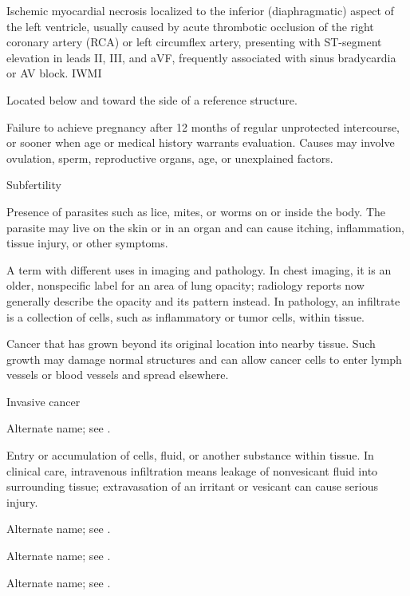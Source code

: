  Ischemic myocardial necrosis localized to the inferior (diaphragmatic) aspect of the left ventricle, usually caused by acute thrombotic occlusion of the right coronary artery (RCA) or left circumflex artery, presenting with ST-segment elevation in leads II, III, and aVF, frequently associated with sinus bradycardia or AV block.
\synonyms
IWMI

 Located below and toward the side of a reference structure.

 Failure to achieve pregnancy after 12 months of regular unprotected intercourse, or sooner when age or medical history warrants evaluation. Causes may involve ovulation, sperm, reproductive organs, age, or unexplained factors.

\synonyms
Subfertility

 Presence of parasites such as lice, mites, or worms on or inside the body. The parasite may live on the skin or in an organ and can cause itching, inflammation, tissue injury, or other symptoms.

 A term with different uses in imaging and pathology. In chest imaging, it is an older, nonspecific label for an area of lung opacity; radiology reports now generally describe the opacity and its pattern instead. In pathology, an infiltrate is a collection of cells, such as inflammatory or tumor cells, within tissue.

 Cancer that has grown beyond its original location into nearby tissue. Such growth may damage normal structures and can allow cancer cells to enter lymph vessels or blood vessels and spread elsewhere.

\synonyms
Invasive cancer

 Alternate name; see .

 Entry or accumulation of cells, fluid, or another substance within tissue. In clinical care, intravenous infiltration means leakage of nonvesicant fluid into surrounding tissue; extravasation of an irritant or vesicant can cause serious injury.

 Alternate name; see .

 Alternate name; see .

 Alternate name; see .

